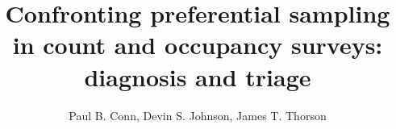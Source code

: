\documentclass[times,mee,doublespace,]{besauth2}
\begin{document}


\title{Confronting preferential sampling in count and occupancy surveys: diagnosis and triage \footnotemark[2]}

\author{Paul B. Conn\corrauth, Devin S. Johnson, James T. Thorson}


\address{National Marine Mammal Laboratory, Alaska Fisheries Science Center, NOAA National Marine Fisheries Service, 7600 Sand Point Way NE, Seattle, WA 98115 USA;  Fisheries Resource Assessment and Monitoring Division (FRAM), Northwest Fisheries Science Center, National Marine Fisheries Service (NMFS),
NOAA, 2725 Montlake Boulevard E, Seattle, WA 98112, USA}

\end{document}
